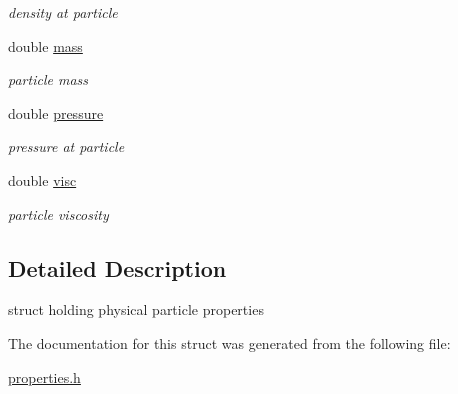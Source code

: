 \begin{DoxyCompactItemize}
\begin{DoxyCompactList}\small\item\em density at particle \end{DoxyCompactList}\item 
\hypertarget{structProperties_aded5ddc676b930dfbdfa81f78ef2547e}{double \hyperlink{structProperties_aded5ddc676b930dfbdfa81f78ef2547e}{mass}}\label{structProperties_aded5ddc676b930dfbdfa81f78ef2547e}

\begin{DoxyCompactList}\small\item\em particle mass \end{DoxyCompactList}\item 
\hypertarget{structProperties_a001e790a070fc788d99ab472330e70fb}{double \hyperlink{structProperties_a001e790a070fc788d99ab472330e70fb}{pressure}}\label{structProperties_a001e790a070fc788d99ab472330e70fb}

\begin{DoxyCompactList}\small\item\em pressure at particle \end{DoxyCompactList}\item 
\hypertarget{structProperties_a7c07daf004e24ec22e6a12febef4db6f}{double \hyperlink{structProperties_a7c07daf004e24ec22e6a12febef4db6f}{visc}}\label{structProperties_a7c07daf004e24ec22e6a12febef4db6f}

\begin{DoxyCompactList}\small\item\em particle viscosity \end{DoxyCompactList}\end{DoxyCompactItemize}


\subsection{\-Detailed \-Description}
struct holding physical particle properties 

\-The documentation for this struct was generated from the following file\-:\begin{DoxyCompactItemize}
\item 
\hyperlink{properties_8h}{properties.\-h}\end{DoxyCompactItemize}
